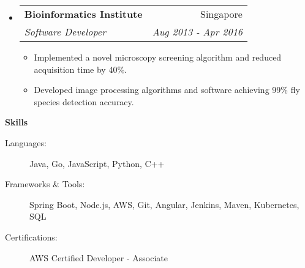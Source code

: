 \documentclass[letterpaper,11pt]{article}
\makeatletter
\newcommand{\resitem}[1]{\item #1 \vspace{-2pt}}
\newcommand{\resheading}[1]{{\large \colorbox{mygrey}{\begin{minipage}{\textwidth}{\textbf{#1 \vphantom{p\^{E}}}}\end{minipage}}}}
\newcommand{\ressubheading}[4]{
\begin{tabular*}{7.0in}{l@{\extracolsep{\fill}}r}
		\textbf{#1} & #2 \\
		\textit{#3} & \textit{#4} \\
\end{tabular*}\vspace{-6pt}}
\makeatother
\begin{document}
\begin{itemize}
\item
	\ressubheading{Bioinformatics Institute}{Singapore}{Software Developer}{Aug 2013 - Apr 2016}
	\begin{itemize}
		\resitem{Implemented a novel microscopy screening algorithm and reduced acquisition time by 40\%.}
		\resitem{Developed image processing algorithms and software achieving 99\% fly species detection accuracy.}
	\end{itemize}

\vspace{0.1in}
\end{itemize}

\resheading{Skills}
\begin{description}
\item[Languages:] Java, Go, JavaScript, Python, C++
\item[Frameworks \& Tools:] Spring Boot, Node.js, AWS, Git, Angular, Jenkins, Maven, Kubernetes, SQL
\item[Certifications:] AWS Certified Developer - Associate
\end{description}
\end{document}
